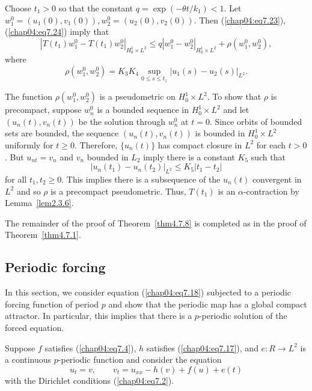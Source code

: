 \documentclass{surv-l}
\theoremstyle{plain}
\theoremstyle{definition}
\numberwithin{equation}{section}
\numberwithin{figure}{chapter}
\begin{document}
Choose $t_{1}>0$ so that the constant $q=\exp(-\theta t/k_{1})<1$. Let $w_{1}^{0}= (u_{1}(0), v_{1}(0)), w_{2}^{0}=(u_{2}(0), v_{2}(0))$. Then (\ref{chap04:eq7.23}), (\ref{chap04:eq7.24}) imply that
\begin{equation}\label{chap04:eq7.25}
|T(t_{1})w_{1}^{0}-T(t_{1})w_{2}^{0}|_{H_{0}^{1}\times L^{2}}\leq q|w_{1}^{0}-w_{2}^{0}|_{H_{0}^{1}\times L^{2}}+\rho(w_{1}^{0}, w_{2}^{0}),
\end{equation}
where
\begin{equation*}
\rho(w_{1}^{0}, w_{2}^{0})=K_{3}K_{4}\sup_{0\leq s\leq t_{1}}|u_{1}(s)-u_{2}(s)|_{L^{2}}.
\end{equation*}

The function $\rho(w_{1}^{0}, w_{2}^{0})$ is a pseudometric on $H_{0}^{1}\times L^{2}$. To show that $\rho$ is precompact, suppose $w_{n}^{0}$ is a bounded sequence in $H_{0}^{1}\times L^{2}$ and let $(u_{n}(t), v_{n}(t))$ be the solution through $w_{n}^{0}$ at $t=0$. Since orbits of bounded sets are bounded, the sequence $(u_{n}(t), v_{n}(t))$ is bounded in $H_{0}^{1}\times L^{2}$ uniformly for $t\geq 0$. Therefore, $\{u_{n}(t)\}$ has compact closure in $L^{2}$ for each $t>0$. But $u_{nt}=v_{n}$ and $v_{n}$ bounded in $L_{2}$ imply there is a constant $K_{5}$ such that
\begin{equation*}
|u_{n}(t_{1})-u_{n}(t_{2})|_{L^{2}}\leq K_{5}|t_{1}-t_{2}|
\end{equation*}
for all $t_{1}, t_{2}\geq 0$. This implies there is a subsequence of the $u_{n}(t)$ convergent in $L^{2}$ and so $\rho$ is a precompact pseudometric. Thus, $T(t_{1})$ is an $\alpha$-contraction by Lemma~\ref{lem2.3.6}.

The remainder of the proof of Theorem~\ref{thm4.7.8} is completed as in the proof of Theorem~\ref{thm4.7.1}.

\subsection{Periodic forcing}\label{subsec4.7.4} In this section, we consider equation (\ref{chap04:eq7.18}) subjected to a periodic forcing function of period $p$ and show that the periodic map has a global compact attractor. In particular, this implies that there is a $p$-periodic solution of the forced equation.

Suppose $f$ satisfies (\ref{chap04:eq7.4}), $h$ satisfies (\ref{chap04:eq7.17}), and $e\!:R\rightarrow L^{2}$ is a continuous $p$-periodic function and consider the equation
\begin{equation}\label{chap04:eq7.26}
u_{t}=v,\quad\quad v_{t}=u_{xx}-h(v)+f(u)+e(t)
\end{equation}
with the Dirichlet conditions (\ref{chap04:eq7.2}).
\end{document}
